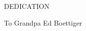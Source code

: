 

\prelimheaders

\noindent\begin{minipage}{\textwidth-0.5in}
\centerline{DEDICATION}

To Grandpa Ed Boettiger
\end{minipage}



